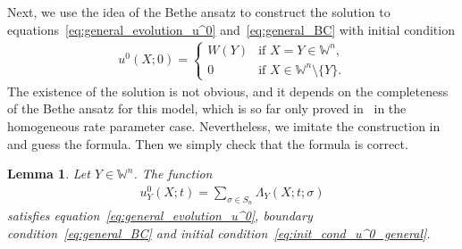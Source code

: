 \documentclass[pdftex]{sigma}
\numberwithin{equation}{section}
\newtheorem{Lemma}[Theorem]{Lemma}
 { \theoremstyle{definition}
\newtheorem{Remark}[Theorem]{Remark} }
\newcommand{\Weylchamber}{\mathbb{W}}
\begin{document}
Next, we use the idea of the Bethe ansatz to construct the solution to equations~\eqref{eq:general_evolution_u^0} and~\eqref{eq:general_BC} with initial condition
\begin{gather} \label{eq:init_cond_u^0_general}
 u^0(X; 0) =
 \begin{cases}
 W(Y) & \text{if $X = Y \in \Weylchamber^n$}, \\
 0 & \text{if $X \in \Weylchamber^n {\setminus} \{ Y \}$}.
 \end{cases}
\end{gather}
The existence of the solution is not obvious, and it depends on the completeness of the Bethe ansatz for this model, which is so far only proved in~\cite{Borodin-Corwin-Petrov-Sasamoto15} in the homogeneous rate parameter case. Nevertheless, we imitate the construction in~\cite{Korhonen-Lee14} and guess the formula. Then we simply check that the formula is correct.

\begin{Lemma} \label{lem:Bethe_ansatz_solution}
 Let $Y \in \Weylchamber^n$. The function
 \begin{gather*}
 u^0_Y(X; t) = \sum_{\sigma \in S_n} \Lambda_Y(X; t; \sigma)
 \end{gather*}
 satisfies equation~\eqref{eq:general_evolution_u^0}, boundary condition~\eqref{eq:general_BC} and initial condition~\eqref{eq:init_cond_u^0_general}.
\end{Lemma}
\end{document}

